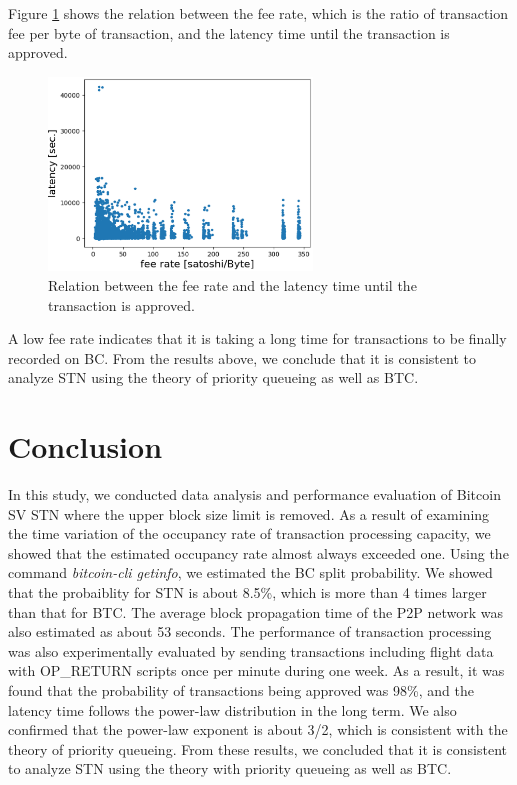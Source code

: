 \documentclass[graybox]{svmult}
\begin{document}
Figure \ref{fig:exp3-3} shows the relation between the fee rate, which is the ratio of transaction fee per byte of transaction, and the latency time until the transaction is approved. 
%
\begin{figure}[t]
  \begin{center}
    \includegraphics[width=70mm]{exp3-3.eps}
  \end{center}
  \caption{Relation between the fee rate and the latency time until the transaction is approved.}
  \label{fig:exp3-3}
\end{figure}
%
A low fee rate indicates that it is taking a long time for transactions to be finally recorded on BC.
From the results above, we conclude that it is consistent to analyze STN using the theory of priority queueing as well as BTC. 



\section{Conclusion}
\label{sec:conclusion}

In this study, we conducted data analysis and performance evaluation of Bitcoin SV STN where the upper block size limit is removed. 
As a result of examining the time variation of the occupancy rate of transaction processing capacity, we showed that the estimated occupancy rate almost always exceeded one. 
Using the command \textit{bitcoin-cli getinfo}, we estimated the BC split probability. 
We showed that the probaiblity for STN is about 8.5\%, which is more than 4 times larger than that for BTC.
The average block propagation time of the P2P network was also estimated as about 53 seconds.
The performance of transaction processing was also experimentally evaluated by sending transactions including flight data with OP\_RETURN scripts once per minute during one week.
As a result, it was found that the probability of transactions being approved was 98\%, and the latency time follows the power-law distribution in the long term. 
We also confirmed that the power-law exponent is about 3/2, which is consistent with the theory of priority queueing.
From these results, we concluded that it is consistent to analyze STN using the theory with priority queueing as well as BTC. 
\end{document}
